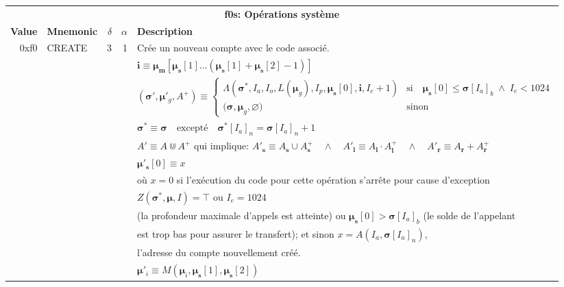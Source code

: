 \documentclass[9pt,oneside]{amsart}
\begin{document}
\begin{tabular*}{\columnwidth}[h]{rlrrl}
\toprule
\multicolumn{5}{c}{\textbf{f0s: Opérations système}} \vspace{5pt} \\
\textbf{Value} & \textbf{Mnemonic} & $\delta$ & $\alpha$ & \textbf{Description} \vspace{5pt} \\
0xf0 & {\small CREATE} & 3 & 1 & Crée un nouveau compte avec le code associé. \\
&&&& $\mathbf{i} \equiv \boldsymbol{\mu}_\mathbf{m}[ \boldsymbol{\mu}_\mathbf{s}[1] \dots (\boldsymbol{\mu}_\mathbf{s}[1] + \boldsymbol{\mu}_\mathbf{s}[2] - 1) ]$ \\
&&&& $(\boldsymbol{\sigma}', \boldsymbol{\mu}'_g, A^+) \equiv \begin{cases}\Lambda(\boldsymbol{\sigma}^*, I_a, I_o, L(\boldsymbol{\mu}_g), I_p, \boldsymbol{\mu}_\mathbf{s}[0], \mathbf{i}, I_e + 1) & \text{si} \quad \boldsymbol{\mu}_\mathbf{s}[0] \leqslant \boldsymbol{\sigma}[I_a]_b \;\wedge\; I_e < 1024\\ \big(\boldsymbol{\sigma}, \boldsymbol{\mu}_g, \varnothing\big) & \text{sinon} \end{cases}$ \\
&&&& $\boldsymbol{\sigma}^* \equiv \boldsymbol{\sigma} \quad \text{excepté} \quad \boldsymbol{\sigma}^*[I_a]_n = \boldsymbol{\sigma}[I_a]_n + 1$ \\
&&&& $A' \equiv A \Cup A^+$ qui implique: $A'_\mathbf{s} \equiv A_\mathbf{s} \cup A^+_\mathbf{s} \quad \wedge \quad A'_\mathbf{l} \equiv A_\mathbf{l} \cdot A^+_\mathbf{l} \quad \wedge \quad A'_\mathbf{r} \equiv A_\mathbf{r} + A^+_\mathbf{r}$ \\
&&&& $\boldsymbol{\mu}'_\mathbf{s}[0] \equiv x$ \\
&&&& où $x=0$ si l'exécution du code pour cette opération s'arrête pour cause d'exception \\
&&&& $Z(\boldsymbol{\sigma}^*, \boldsymbol{\mu}, I) = \top$ ou $I_e = 1024$ \\
&&&& (la profondeur maximale d'appels est atteinte) ou $\boldsymbol{\mu}_\mathbf{s}[0] > \boldsymbol{\sigma}[I_a]_b$ (le solde de l'appelant\\
&&&& est trop  bas pour assurer le transfert); et sinon $x=A(I_a, \boldsymbol{\sigma}[I_a]_n)$,\\
&&&& l'adresse du compte nouvellement créé. \\
&&&& $\boldsymbol{\mu}'_i \equiv M(\boldsymbol{\mu}_i, \boldsymbol{\mu}_\mathbf{s}[1], \boldsymbol{\mu}_\mathbf{s}[2])$ \\

\end{tabular*}
\end{document}
